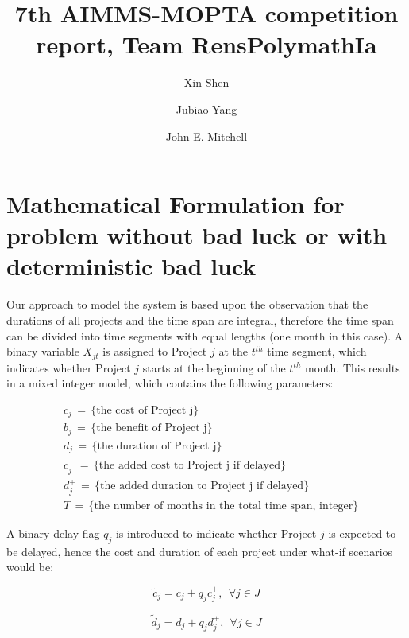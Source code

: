 \documentclass[final,3p,times]{elsarticle}
\begin{document}
\begin{frontmatter}

\title{7th AIMMS-MOPTA competition report, Team RensPolymathIa}


\author[rvt]{Xin Shen}
\author[rvt]{Jubiao Yang}
\author[rvt]{John E. Mitchell}

\address[rvt]{Rensselaer Polytechnic Institute, Troy, NY 12180}


\end{frontmatter}

\section{Mathematical Formulation for problem without bad luck or with deterministic bad luck}
	Our approach to model the system is based upon the observation that the durations of all projects and the time span are integral, therefore the time span can be divided into time segments with equal lengths (one month in this case). A binary variable $X_{jt}$ is assigned to Project $j$ at the $t^{th}$ time segment, which indicates whether Project $j$ starts at the beginning of the $t^{th}$ month. This results in a mixed integer model, which contains the following parameters:

	\begin{align*}
		&c_j\,=\, \{\mbox{the cost of Project j}\}\\
		&b_j\,=\, \{\mbox{the benefit of Project j}\}\\
		&d_j\,=\, \{\mbox{the duration of Project j}\}\\
		&c^+_j\,=\, \{\mbox{the added cost to Project j if delayed}\}\\
		&d^+_j\,=\, \{\mbox{the added duration to Project j if delayed}\}\\
		&T \,=\, \{\mbox{the number of months in the total time span, integer}\}
	\end{align*}
	
	A binary delay flag $q_j$ is introduced to indicate whether Project $j$ is expected to be delayed, hence the cost and duration of each project under what-if scenarios would be:
	
	\begin{equation}
		\tilde{c}_j = c_j + q_j c^+_j,~~\forall j \in J
	\end{equation}
	
	\begin{equation}
		\tilde{d}_j = d_j + q_j d^+_j,~~\forall j \in J
	\end{equation}
\end{document}
